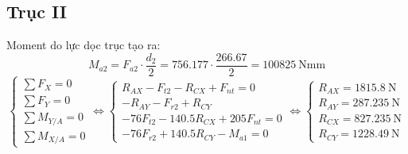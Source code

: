\subsection{Trục II}
Moment do lực dọc trục tạo ra:
\begin{equation}
    M_{a2} = F_{a2} \cdot \frac{d_2}{2} 
           = 756.177 \cdot \frac{266.67}{2} 
           = 100825\ \text{Nmm}
\end{equation}
\[
    \left\{
    \begin{array}{l}
        \sum F_X = 0 \\
        \sum F_Y = 0 \\
        \sum M_{Y/A} = 0 \\
        \sum M_{X/A} = 0
    \end{array}
    \right.
    \Leftrightarrow
    \left\{
    \begin{array}{l}
        R_{AX} - F_{t2} - R_{CX} + F_{nt} = 0 \\
        -R_{AY} - F_{r2} + R_{CY} \\
        -76 F_{t2} - 140.5 R_{CX} + 205 F_{nt} = 0 \\
        -76 F_{r2} + 140.5 R_{CY} - M_{a1} = 0
    \end{array}
    \right.
    \Leftrightarrow
    \left\{
    \begin{array}{l}
        R_{AX} = 1815.8\ \text{N} \\
        R_{AY} = 287.235\ \text{N} \\
        R_{CX} = 827.235\ \text{N} \\
        R_{CY} = 1228.49\ \text{N}
    \end{array}
    \right.
\]
